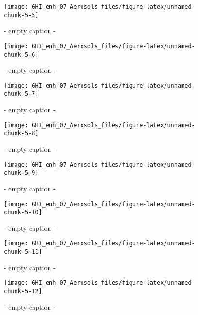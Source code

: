 \documentclass[
  10pt,
  a4paper,oneside]{article}
\begin{document}
\begin{figure}[H]

{\centering \texttt{[image: GHI\_enh\_07\_Aerosols\_files/figure-latex/unnamed-chunk-5-5]} 

}

\caption{ - empty caption - }\label{fig:unnamed-chunk-5-5}
\end{figure}
\begin{figure}[H]

{\centering \texttt{[image: GHI\_enh\_07\_Aerosols\_files/figure-latex/unnamed-chunk-5-6]} 

}

\caption{ - empty caption - }\label{fig:unnamed-chunk-5-6}
\end{figure}
\begin{figure}[H]

{\centering \texttt{[image: GHI\_enh\_07\_Aerosols\_files/figure-latex/unnamed-chunk-5-7]} 

}

\caption{ - empty caption - }\label{fig:unnamed-chunk-5-7}
\end{figure}
\begin{figure}[H]

{\centering \texttt{[image: GHI\_enh\_07\_Aerosols\_files/figure-latex/unnamed-chunk-5-8]} 

}

\caption{ - empty caption - }\label{fig:unnamed-chunk-5-8}
\end{figure}
\begin{figure}[H]

{\centering \texttt{[image: GHI\_enh\_07\_Aerosols\_files/figure-latex/unnamed-chunk-5-9]} 

}

\caption{ - empty caption - }\label{fig:unnamed-chunk-5-9}
\end{figure}
\begin{figure}[H]

{\centering \texttt{[image: GHI\_enh\_07\_Aerosols\_files/figure-latex/unnamed-chunk-5-10]} 

}

\caption{ - empty caption - }\label{fig:unnamed-chunk-5-10}
\end{figure}
\begin{figure}[H]

{\centering \texttt{[image: GHI\_enh\_07\_Aerosols\_files/figure-latex/unnamed-chunk-5-11]} 

}

\caption{ - empty caption - }\label{fig:unnamed-chunk-5-11}
\end{figure}
\begin{figure}[H]

{\centering \texttt{[image: GHI\_enh\_07\_Aerosols\_files/figure-latex/unnamed-chunk-5-12]} 

}

\caption{ - empty caption - }\label{fig:unnamed-chunk-5-12}
\end{figure}
\end{document}
